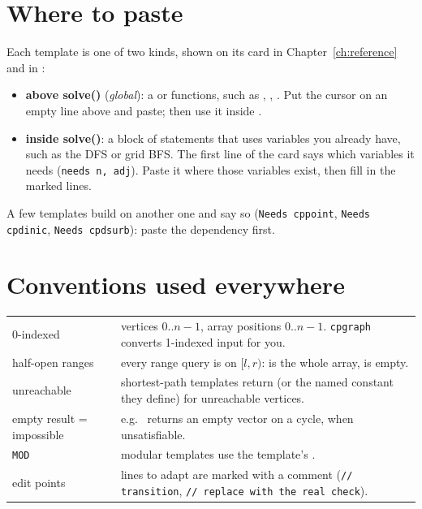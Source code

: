 \section{Where to paste}

Each template is one of two kinds, shown on its card in Chapter~\ref{ch:reference} and in :

\begin{itemize}
  \item \textbf{above solve()} (\emph{global}): a  or functions, such as , ,
        . Put the cursor on an empty line above  and paste; then use it inside
        .
  \item \textbf{inside solve()}: a block of statements that uses variables you already have, such as the DFS or grid
        BFS. The first line of the card says which variables it needs (\texttt{needs n, adj}). Paste it where those
        variables exist, then fill in the marked lines.
\end{itemize}

A few templates build on another one and say so (\texttt{Needs cppoint}, \texttt{Needs cpdinic}, \texttt{Needs cpdsurb}):
paste the dependency first.

\section{Conventions used everywhere}

\begin{center}
\begin{tabularx}{\linewidth}{p{4cm}L}
\toprule
{} &  \\
-indexed & vertices $0..n-1$, array positions $0..n-1$. \texttt{cpgraph} converts 1-indexed input for you. \\
half-open ranges & every range query is on $[l, r)$:  is the whole array,  is empty. \\
unreachable & shortest-path templates return  (or the named constant they define) for unreachable vertices. \\
empty result = impossible & e.g.\  returns an empty vector on a cycle,  when unsatisfiable. \\
\texttt{MOD} & modular templates use the template's . \\
edit points & lines to adapt are marked with a comment (\texttt{// transition}, \texttt{// replace with the real check}). \\
\bottomrule
\end{tabularx}
\end{center}

